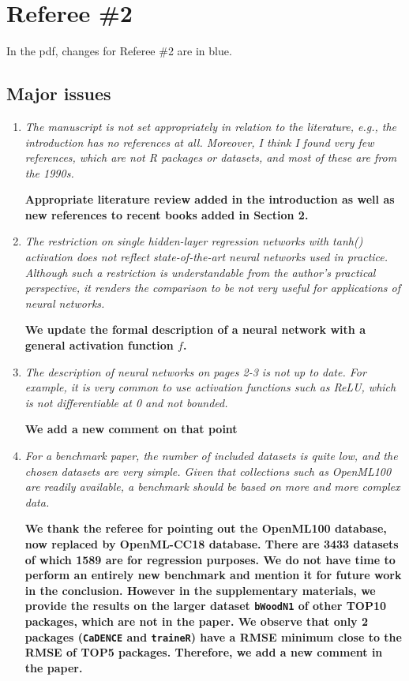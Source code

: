 \documentclass[12pt]{article}
\newcommand{\code}{\texttt}
\newcommand{\blue}[1]{{\color{blue}#1}}
\begin{document}
\section{Referee \#2}\label{referee2}

In the pdf, changes for Referee \#2 are in \blue{blue}.  

\subsection*{Major issues}

\begin{enumerate}
\item \textit{The manuscript is not set appropriately in relation to the literature, e.g., the introduction has no references at all. Moreover, I think I found very few references, which are not R packages or datasets, and most of these are from the 1990s.}

\textbf{Appropriate literature review added in the introduction as well 
as new references to recent books added in Section 2.
}


\item \textit{The restriction on single hidden-layer regression networks with tanh() activation does not reflect state-of-the-art neural networks used in practice. Although such a restriction is understandable from the author’s practical perspective, it renders the comparison to be not very useful for applications of neural networks.}

\textbf{We update the formal description of a neural network with a general activation function $f$.}

\item \textit{The description of neural networks on pages 2-3 is not up to date. For example, it is very common to use activation functions such as ReLU, which is not differentiable at 0 and not bounded.}

\textbf{We add a new comment on that point}


\item \textit{For a benchmark paper, the number of included datasets is quite low, and the chosen datasets are very simple. Given that collections such as OpenML100 are readily available, a benchmark should be based on more and more complex data.}

\textbf{We thank the referee for pointing out the OpenML100 database, now replaced by OpenML-CC18 database. 
There are 3433 datasets of which 1589 are for regression purposes.
We do not have time to perform an entirely new benchmark and mention it for future work in the conclusion.
However in the supplementary materials, we provide the results on the larger dataset 
\code{bWoodN1} of other TOP10 packages, which are not in the paper.
We observe that only 2 packages (\code{CaDENCE} and \code{traineR}) 
have a RMSE minimum close to the RMSE of TOP5 packages.
Therefore, we add a new comment in the paper.}




\end{enumerate}
\end{document}
